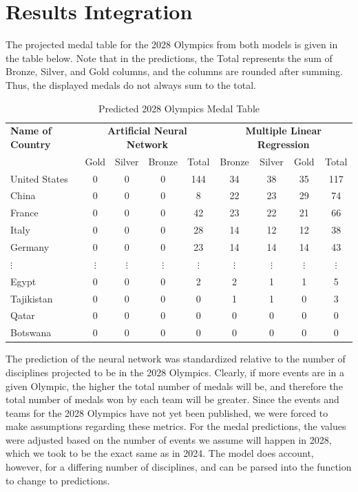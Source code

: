 \documentclass{mcmthesis}
\begin{document}
\section{Results Integration}\label{sec:results-integration}

The projected medal table for the 2028 Olympics from both models is given in the table below. Note that in the predictions, the Total represents the sum of Bronze, Silver, and Gold columns, and the columns are rounded after summing. Thus, the displayed medals do not always sum to the total.

\begin{table}[H]
\centering 
\caption{Predicted 2028 Olympics Medal Table}
\label{A}
\vspace{5pt}
\begin{tabular}{l|cccc|cccc}
\hline
\textbf{Name of Country} & 
\multicolumn{4}{c}{\textbf{Artificial Neural Network}} & 
\multicolumn{4}{c}{\textbf{Multiple Linear Regression}} \\
\cline{2-5} \cline{6-9}
& Gold & Silver & Bronze & Total & Bronze & Silver & Gold & Total \\
\hline\hline
United States & 0 & 0 & 0 & 144 & 34 & 38 & 35 & 117 \\
China         & 0 & 0 & 0 & 8   & 22 & 23 & 29 & 74 \\
France        & 0 & 0 & 0 & 42  & 23 & 22 & 21 & 66 \\
Italy         & 0 & 0 & 0 & 28  & 14 & 12 & 12 & 38 \\
Germany       & 0 & 0 & 0 & 23  & 14 & 14 & 14 & 43 \\ 
$\vdots$ & $\vdots$ & $\vdots$ & $\vdots$ & $\vdots$ & $\vdots$ & $\vdots$ & $\vdots$ & $\vdots$ \\ 
Egypt         & 0 & 0 & 0 & 2   & 2 & 1 & 1 & 5 \\
Tajikistan    & 0 & 0 & 0 & 0   & 1 & 1 & 0 & 3 \\
Qatar         & 0 & 0 & 0 & 0   & 0 & 0 & 0 & 0 \\
Botswana      & 0 & 0 & 0 & 0   & 0 & 0 & 0 & 0 \\ 
\hline
\end{tabular}
\end{table}

The prediction of the neural network was standardized relative to the number of disciplines projected to be in the 2028 Olympics. Clearly, if more events are in a given Olympic, the higher the total number of medals will be, and therefore the total number of medals won by each team will be greater. Since the events and teams for the 2028 Olympics have not yet been published, we were forced to make assumptions regarding these metrics. For the medal predictions, the values were adjusted based on the number of events we assume will happen in 2028, which we took to be the exact same as in 2024. The model does account, however, for a differing number of disciplines, and can be parsed into the function to change to predictions.
\end{document}
